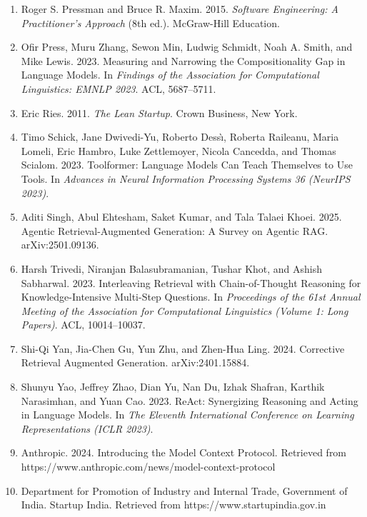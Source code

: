 \documentclass[oneside,a4paper,12pt]{report}
\begin{document}
\begin{appendices}
\begin{enumerate}
\item Roger S. Pressman and Bruce R. Maxim. 2015. \textit{Software Engineering: A Practitioner's Approach} (8th ed.). McGraw-Hill Education.
\item Ofir Press, Muru Zhang, Sewon Min, Ludwig Schmidt, Noah A. Smith, and Mike Lewis. 2023. Measuring and Narrowing the Compositionality Gap in Language Models. In \textit{Findings of the Association for Computational Linguistics: EMNLP 2023}. ACL, 5687--5711.
\item Eric Ries. 2011. \textit{The Lean Startup}. Crown Business, New York.
\item Timo Schick, Jane Dwivedi-Yu, Roberto Dess\`{\i}, Roberta Raileanu, Maria Lomeli, Eric Hambro, Luke Zettlemoyer, Nicola Cancedda, and Thomas Scialom. 2023. Toolformer: Language Models Can Teach Themselves to Use Tools. In \textit{Advances in Neural Information Processing Systems 36 (NeurIPS 2023)}.
\item Aditi Singh, Abul Ehtesham, Saket Kumar, and Tala Talaei Khoei. 2025. Agentic Retrieval-Augmented Generation: A Survey on Agentic RAG. arXiv:2501.09136.
\item Harsh Trivedi, Niranjan Balasubramanian, Tushar Khot, and Ashish Sabharwal. 2023. Interleaving Retrieval with Chain-of-Thought Reasoning for Knowledge-Intensive Multi-Step Questions. In \textit{Proceedings of the 61st Annual Meeting of the Association for Computational Linguistics (Volume 1: Long Papers)}. ACL, 10014--10037.
\item Shi-Qi Yan, Jia-Chen Gu, Yun Zhu, and Zhen-Hua Ling. 2024. Corrective Retrieval Augmented Generation. arXiv:2401.15884.
\item Shunyu Yao, Jeffrey Zhao, Dian Yu, Nan Du, Izhak Shafran, Karthik Narasimhan, and Yuan Cao. 2023. ReAct: Synergizing Reasoning and Acting in Language Models. In \textit{The Eleventh International Conference on Learning Representations (ICLR 2023)}.
\item Anthropic. 2024. Introducing the Model Context Protocol. Retrieved from https://www.anthropic.com/news/model-context-protocol
\item Department for Promotion of Industry and Internal Trade, Government of India. Startup India. Retrieved from https://www.startupindia.gov.in
\end{enumerate}


\end{appendices}
\end{document}
